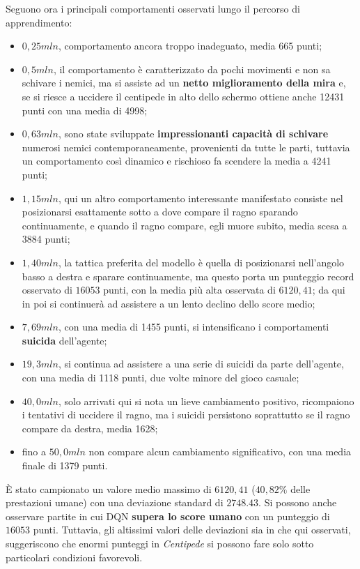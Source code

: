 \documentclass[twoside,twocolumn,10pt]{extarticle}
\theoremstyle{definition}
\begin{document}
			Seguono ora i principali comportamenti osservati lungo il percorso di apprendimento:			
			\begin{itemize}
				\item $0,25mln$, comportamento ancora troppo inadeguato, media 665 punti;
				\item $0,5mln$, il comportamento è caratterizzato da pochi movimenti e non sa schivare i nemici, ma si assiste ad un \textbf{netto miglioramento della mira} e, se si riesce a uccidere il centipede in alto dello schermo ottiene anche 12431 punti con una media di 4998;
				\item $0,63mln$, sono state sviluppate \textbf{impressionanti capacità di schivare} numerosi nemici contemporaneamente, provenienti da tutte le parti, tuttavia un comportamento così dinamico e rischioso fa scendere la media a 4241 punti;
				\item $1,15mln$, qui un altro comportamento interessante manifestato consiste nel posizionarsi esattamente sotto a dove compare il ragno sparando continuamente, e quando il ragno compare, egli muore subito, media scesa a 3884 punti;
				\item $1,40mln$, la tattica preferita del modello è quella di posizionarsi nell'angolo basso a destra e sparare continuamente, ma questo porta un punteggio record osservato di $16053$ punti, con la media più alta osservata di $6120,41$; da qui in poi si continuerà ad assistere a un lento declino dello score medio;
				\item $7,69mln$, con una media di 1455 punti, si intensificano i comportamenti \textbf{suicida} dell'agente;
				\item $19,3mln$, si continua ad assistere a una serie di suicidi da parte dell'agente, con una media di 1118 punti, due volte minore del gioco casuale;
				\item $40,0mln$, solo arrivati qui si nota un lieve cambiamento positivo, ricompaiono i tentativi di uccidere il ragno, ma i suicidi persistono soprattutto se il ragno compare da destra, media 1628;
				\item fino a $50,0mln$ non compare alcun cambiamento significativo, con una media finale di 1379 punti.
			\end{itemize}
			
			È stato campionato un valore medio massimo di $6120,41$ ($40,82\%$ delle prestazioni umane) con una deviazione standard di $2748.43$. Si possono anche osservare partite in cui DQN \textbf{supera lo score umano} con un punteggio di $16053$ punti. Tuttavia, gli altissimi valori delle deviazioni sia in \cite{bib:dqn} che qui osservati, suggeriscono che enormi punteggi in \textit{Centipede} si possono fare solo sotto particolari condizioni favorevoli.
\end{document}

